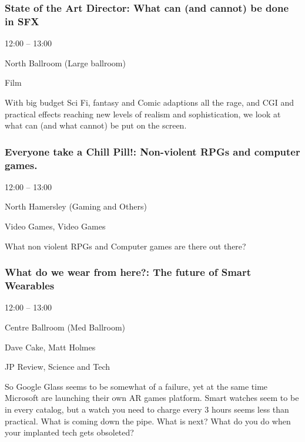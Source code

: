 \documentclass{scrreprt}
\begin{document}
\begin{multicols}{2}
\subsubsection*{State of the Art Director: What can (and cannot) be done in SFX}\begin{description}
\setlength{\itemsep}{0pt}
\setlength{\parsep}{0pt}
\setlength{\parskip}{0pt}
\item[Time:]{12:00 -- 13:00}
\item[Venue:]{North Ballroom (Large ballroom)}
\item[Tags:]{Film}\end{description}
With big budget Sci Fi, fantasy and Comic adaptions all the rage, and CGI and practical effects reaching new levels of realism and sophistication, we look at what can (and what cannot) be put on the screen.
\subsubsection*{Everyone take a Chill Pill!: Non-violent RPGs and computer games.}\begin{description}
\setlength{\itemsep}{0pt}
\setlength{\parsep}{0pt}
\setlength{\parskip}{0pt}
\item[Time:]{12:00 -- 13:00}
\item[Venue:]{North Hamersley (Gaming and Others)}
\item[Tags:]{Video Games, Video Games}\end{description}
What non violent RPGs and Computer games are there out there?
\subsubsection*{What do we wear from here?: The future of Smart Wearables}\begin{description}
\setlength{\itemsep}{0pt}
\setlength{\parsep}{0pt}
\setlength{\parskip}{0pt}
\item[Time:]{12:00 -- 13:00}
\item[Venue:]{Centre Ballroom (Med Ballroom)}
\item[People:]{Dave Cake, Matt Holmes}
\item[Tags:]{JP Review, Science and Tech}\end{description}
So Google Glass seems to be somewhat of a failure, yet at the same time Microsoft are launching their own AR games platform. Smart watches seem to be in every catalog, but a watch you need to charge every 3 hours seems less than practical. What is coming down the pipe. What is next? What do you do when your implanted tech gets obsoleted?

\end{multicols}
\end{document}

